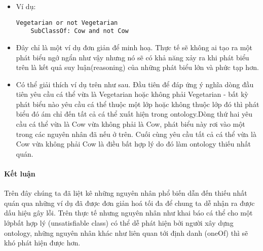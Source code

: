 \begin{itemize}
\item Ví dụ:
\begin{verbatim}
Vegetarian or not Vegetarian
	SubClassOf: Cow and not Cow
\end{verbatim}
\item
Đây chỉ là một ví dụ đơn giản để minh hoạ. Thực tế sẽ không ai tạo ra một phát biểu ngớ ngẩn như vậy nhưng nó sẽ có khả năng xảy ra khi phát biểu trên  là kết quả suy luận(reasoning) của những phát biểu lớn và phức tạp hơn.
\item
Có thể giải thích ví dụ trên như sau. Đầu tiên để đáp ứng ý nghĩa dòng đầu tiên yêu cầu cá thể vừa là Vegetarian hoặc không phải Vegetarian - bất kỳ phát biểu nào yêu cầu cá thể thuộc một lớp hoặc không thuộc lớp đó thì phát biểu đó ám chỉ đến tất cả cá thể xuất hiện trong ontology.Dòng thứ hai yêu cầu cá thể vừa là Cow vừa không phải là Cow, phát biểu này rơi vào một trong các nguyên nhân đã nếu ở trên. Cuối cùng yêu cầu tất cả cá thể vừa là Cow vừa không phải Cow là điều bất hợp lý do đó làm ontology thiếu nhất quán.
\end{itemize}

\paragraph{Kết luận}
Trên đây chúng ta đã liệt kê những nguyên nhân phổ biến dẫn đến thiếu nhất quán qua những ví dụ đã được đơn giản hoá tối đa để chung ta dễ nhận ra được dấu hiệu gây lỗi. Trên thực tế nhưng nguyên nhân như khai báo cá thể cho một lớpbất hợp lý (unsatisfiable class) có thể dễ phát hiện bởi người xây dựng ontology, những nguyên nhân khác như liên quan tới định danh (oneOf) thì sẽ khó phát hiện được hơn.

